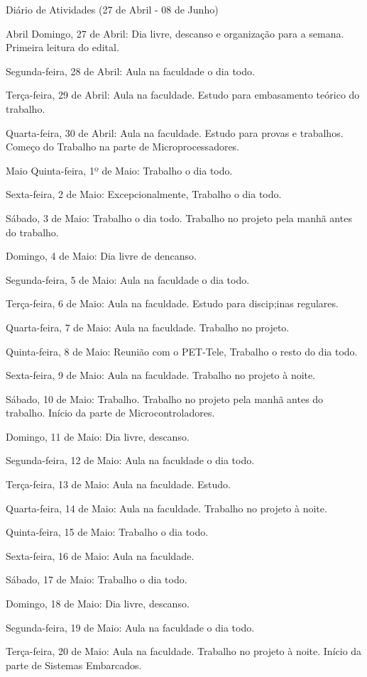 Diário de Atividades (27 de Abril - 08 de Junho)

Abril
Domingo, 27 de Abril: Dia livre, descanso e organização para a semana. Primeira leitura do edital.

Segunda-feira, 28 de Abril: Aula na faculdade o dia todo.

Terça-feira, 29 de Abril: Aula na faculdade. Estudo para embasamento teórico do trabalho.

Quarta-feira, 30 de Abril: Aula na faculdade. Estudo para provas e trabalhos. Começo do Trabalho na parte de Microprocessadores.


Maio
Quinta-feira, 1º de Maio: Trabalho o dia todo.

Sexta-feira, 2 de Maio: Excepcionalmente, Trabalho o dia todo.

Sábado, 3 de Maio: Trabalho o dia todo. Trabalho no projeto pela manhã antes do trabalho.

Domingo, 4 de Maio: Dia livre de dencanso.

Segunda-feira, 5 de Maio: Aula na faculdade o dia todo.

Terça-feira, 6 de Maio: Aula na faculdade. Estudo para discip;inas regulares.

Quarta-feira, 7 de Maio: Aula na faculdade. Trabalho no projeto.

Quinta-feira, 8 de Maio: Reunião com o PET-Tele, Trabalho o resto do dia todo.

Sexta-feira, 9 de Maio: Aula na faculdade. Trabalho no projeto à noite. 

Sábado, 10 de Maio: Trabalho. Trabalho no projeto pela manhã antes do trabalho. Início da parte de Microcontroladores.

Domingo, 11 de Maio: Dia livre, descanso.

Segunda-feira, 12 de Maio: Aula na faculdade o dia todo.

Terça-feira, 13 de Maio: Aula na faculdade. Estudo.

Quarta-feira, 14 de Maio: Aula na faculdade. Trabalho no projeto à noite.

Quinta-feira, 15 de Maio: Trabalho o dia todo.

Sexta-feira, 16 de Maio: Aula na faculdade.

Sábado, 17 de Maio: Trabalho o dia todo.

Domingo, 18 de Maio: Dia livre, descanso.

Segunda-feira, 19 de Maio: Aula na faculdade o dia todo.

Terça-feira, 20 de Maio: Aula na faculdade. Trabalho no projeto à noite. Início da parte de Sistemas Embarcados.

